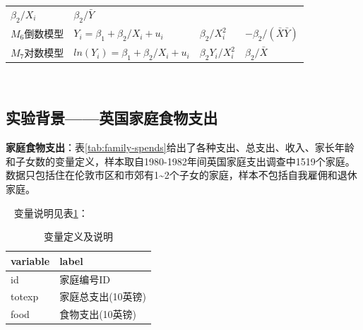 \documentclass[12pt,(landscape,a4paper),(portrait,a4paper)]{article}
\begin{document}
\begin{longtable}[]{@{}llll@{}}
\begin{minipage}[t]{0.17\columnwidth}
\(\beta_2/X_i\)\strut
\end{minipage} & \begin{minipage}[t]{0.22\columnwidth}\raggedright
\(\beta_2/\bar{Y}\)\strut
\end{minipage}\tabularnewline
\begin{minipage}[t]{0.18\columnwidth}\raggedright
\(M_6\)倒数模型\strut
\end{minipage} & \begin{minipage}[t]{0.31\columnwidth}\raggedright
\(Y_i=\beta_1+\beta_2/X_i+u_i\)\strut
\end{minipage} & \begin{minipage}[t]{0.17\columnwidth}\raggedright
\(\beta_2/X_i^2\)\strut
\end{minipage} & \begin{minipage}[t]{0.22\columnwidth}\raggedright
\(-\beta_2/(\bar{X}\bar{Y})\)\strut
\end{minipage}\tabularnewline
\begin{minipage}[t]{0.18\columnwidth}\raggedright
\(M_7\)对数模型\strut
\end{minipage} & \begin{minipage}[t]{0.31\columnwidth}\raggedright
\(ln(Y_i)=\beta_1+\beta_2/X_i+u_i\)\strut
\end{minipage} & \begin{minipage}[t]{0.17\columnwidth}\raggedright
\(\beta_2Y_i/X_i^2\)\strut
\end{minipage} & \begin{minipage}[t]{0.22\columnwidth}\raggedright
\(\beta_2/\bar{X}\)\strut
\end{minipage}\tabularnewline
\bottomrule
\end{longtable}

~

\newpage

\subsection{实验背景------英国家庭食物支出}

\textbf{家庭食物支出}：表\ref{tab:family-spends}给出了各种支出、总支出、收入、家长年龄和子女数的变量定义，样本取自1980-1982年间英国家庭支出调查中1519个家庭。数据只包括住在伦敦市区和市郊有1\textasciitilde{}2个子女的家庭，样本不包括自我雇佣和退休家庭。
~

~ 变量说明见表\ref{tab:family-label}：

\begin{table}

\caption{\label{tab:family-label}变量定义及说明}
\centering
\begin{tabular}[t]{l|l}
\hline
variable & label\\
\hline
id & 家庭编号ID\\
\hline
totexp & 家庭总支出(10英镑)\\
\hline
food & 食物支出(10英镑)\\
\hline
\end{tabular}
\end{table}
\end{document}
